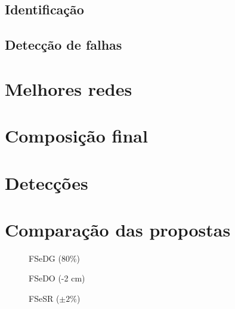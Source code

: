 \subsection{Identificação}

\subsection{Detecção de falhas}

\section{Melhores redes}

\section{Composição final}

\section{Detecções}

\section{Comparação das propostas}

\begin{figure}[htb]
\footnotesize
\centering

\vspace{1cm}
\caption{FSeDG (80\%)}
\label{fig:fsedg}
\end{figure}

\begin{figure}[htb]
\footnotesize
\centering

\vspace{1cm}
\caption{FSeDO (-2 cm)}
\label{fig:fsedo}
\end{figure}

\begin{figure}[htb]
\footnotesize
\centering

\vspace{1cm}
\caption{FSeSR ($\pm 2\%$)}
\label{fig:fsesr}
\end{figure}

